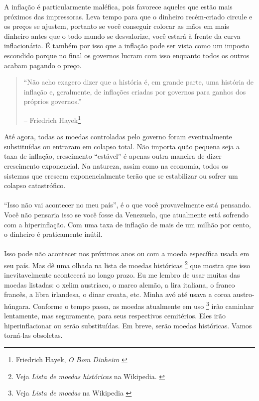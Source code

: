A inflação é particularmente maléfica, pois favorece aqueles que estão mais próximos das impressoras. Leva tempo para que o dinheiro recém-criado circule e os preços se ajustem, portanto se você conseguir colocar as mãos em mais dinheiro antes que o todo mundo se desvalorize, você estará à frente da curva inflacionária. É também por isso que a inflação pode ser vista como um imposto escondido porque no final os governos lucram com isso enquanto todos os outros acabam pagando o preço.

\begin{quotation}\begin{samepage}
\enquote{Não acho exagero dizer que a história é, em grande parte, uma história de inflação e, geralmente, de inflações criadas por governos para ganhos dos próprios governos.}
\begin{flushright} -- Friedrich Hayek\footnote{Friedrich Hayek, \textit{O Bom Dinheiro} \cite{hayek-good-money}}
\end{flushright}\end{samepage}\end{quotation}

Até agora, todas as moedas controladas pelo governo foram eventualmente substituídas ou entraram em colapso total. Não importa quão pequena seja a taxa de inflação, crescimento \enquote{estável} é apenas outra maneira de dizer crescimento exponencial. Na natureza, assim como na economia, todos os sistemas que crescem exponencialmente terão que se estabilizar ou sofrer um colapso catastrófico.

\paragraph{}
\enquote{Isso não vai acontecer no meu país}, é o que você provavelmente está pensando. Você não pensaria isso se você fosse da Venezuela, que atualmente está sofrendo com a hiperinflação. Com uma taxa de inflação de mais de um milhão por cento, o dinheiro é praticamente inútil. \cite{wiki:venezuela}

\paragraph{}
Isso pode não acontecer nos próximos anos ou com a moeda específica usada em seu país. Mas dê uma olhada na lista de moedas históricas \footnote{Veja \textit{Lista de moedas históricas} na Wikipedia. \cite{wiki:historical-currencies}} que mostra que isso inevitavelmente acontecerá no longo prazo. Eu me lembro de usar muitas das moedas listadas: o xelim austríaco, o marco alemão, a lira italiana, o franco francês, a libra irlandesa, o dinar croata, etc. Minha avó até usava a coroa austro-húngara. Conforme o tempo passa, as moedas atualmente em uso \footnote{Veja \textit{Lista de moedas} na Wikipedia \cite{wiki:list-of-currencies}} irão caminhar lentamente, mas seguramente, para seus respectivos cemitérios. Eles irão hiperinflacionar ou serão substituídas. Em breve, serão moedas históricas. Vamos torná-las obsoletas.

